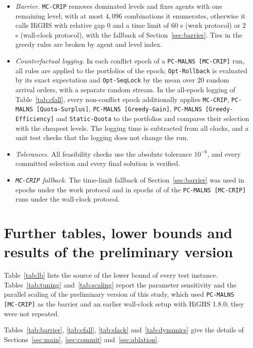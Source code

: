 \documentclass[a4paper,fleqn]{cas-sc}
\newcommand{\mcc}{\texttt{MC-CRIP}}
\newcommand{\pge}{\texttt{PC-MALNS [Greedy-Efficiency]}}
\newcommand{\pmc}{\texttt{PC-MALNS [MC-CRIP]}}
\newcommand{\pqs}{\texttt{PC-MALNS [Quota-Surplus]}}
\newcommand{\pgg}{\texttt{PC-MALNS [Greedy-Gain]}}
\begin{document}
\begin{itemize}[noitemsep]
    \item \textit{Barrier.} \mcc{} removes dominated levels and fixes agents with one remaining level; with at most $4{,}096$ combinations it enumerates, otherwise it calls HiGHS with relative gap $0$ and a time limit of $60$ s (work protocol) or $2$ s (wall-clock protocol), with the fallback of Section~\ref{sec:barrier}. Ties in the greedy rules are broken by agent and level index.
    \item \textit{Counterfactual logging.} In each conflict epoch of a \pmc{} run, all rules are applied to the portfolios of the epoch; \texttt{Opt-Rollback} is evaluated by its exact expectation and \texttt{Opt-SeqLock} by the mean over $20$ random arrival orders, with a separate random stream. In the all-epoch logging of Table~\ref{tab:cfall}, every non-conflict epoch additionally applies \mcc, \pqs, \pgg, \pge{} and \texttt{Static-Quota} to the portfolios and compares their selection with the cheapest levels. The logging time is subtracted from all clocks, and a unit test checks that the logging does not change the run.
    \item \textit{Tolerances.} All feasibility checks use the absolute tolerance $10^{-6}$, and every committed selection and every final solution is verified.
    \item \textit{\mcc{} fallback.} The time-limit fallback of Section~\ref{sec:barrier} was used in \FallbackWorkEpochs{} epochs under the work protocol and in \FallbackWallEpochs{} epochs of \FallbackWallRuns{} of the \FallbackWallTotalRuns{} \pmc{} runs under the wall-clock protocol.
\end{itemize}

\section{Further tables, lower bounds and results of the preliminary version}
\label{app:extra}
\setcounter{table}{0}
\renewcommand{\thetable}{\thesection.\arabic{table}}
Table~\ref{tab:lb} lists the source of the lower bound of every test instance. Tables~\ref{tab:tuning} and~\ref{tab:scaling} report the parameter sensitivity and the parallel scaling of the preliminary version of this study, which used \pmc{} as the barrier and an earlier wall-clock setup with HiGHS 1.8.0; they were not repeated.

Tables~\ref{tab:barrier}, \ref{tab:cfall}, \ref{tab:slack} and~\ref{tab:dynamics} give the details of Sections~\ref{sec:main}, \ref{sec:commit} and~\ref{sec:ablation}.
\end{document}

